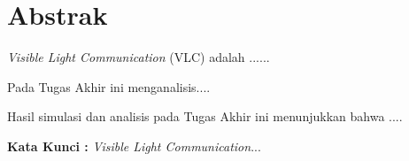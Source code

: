 \chapter*{Abstrak}
\vspace*{0.3 cm}
\textit{Visible Light Communication} (VLC) adalah ......\par

Pada Tugas Akhir ini menganalisis.... \par

Hasil simulasi dan analisis pada Tugas Akhir ini menunjukkan bahwa ....\par
\vspace*{1 cm}
\noindent\textbf{Kata Kunci : } \textit{Visible Light Communication}...